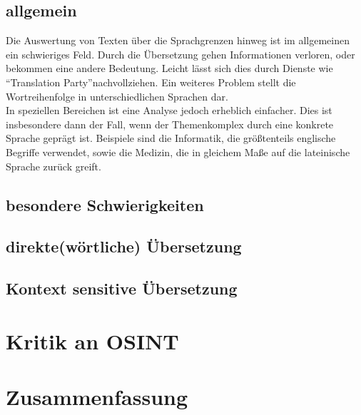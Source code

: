 \documentclass[twoside,a4paper]{article}
\begin{document}
\subsection{allgemein}
Die Auswertung von Texten über die Sprachgrenzen hinweg ist im allgemeinen ein schwieriges Feld. Durch die Übersetzung gehen Informationen verloren, oder bekommen eine andere Bedeutung. Leicht lässt sich dies durch Dienste wie \enquote{Translation Party}\footnotemark nachvollziehen. Ein weiteres Problem stellt die Wortreihenfolge in unterschiedlichen Sprachen dar.\\
In speziellen Bereichen ist eine Analyse jedoch erheblich einfacher. Dies ist insbesondere dann der Fall, wenn der Themenkomplex durch eine konkrete Sprache geprägt ist. Beispiele sind die Informatik, die größtenteils englische Begriffe verwendet, sowie die Medizin, die in gleichem Maße auf die lateinische Sprache zurück greift.\\


\subsection{besondere Schwierigkeiten}


\subsection{direkte(wörtliche) Übersetzung}


\subsection{Kontext sensitive Übersetzung}



\section{Kritik an OSINT}



\section{Zusammenfassung}


\nocite{*}


\end{document}

